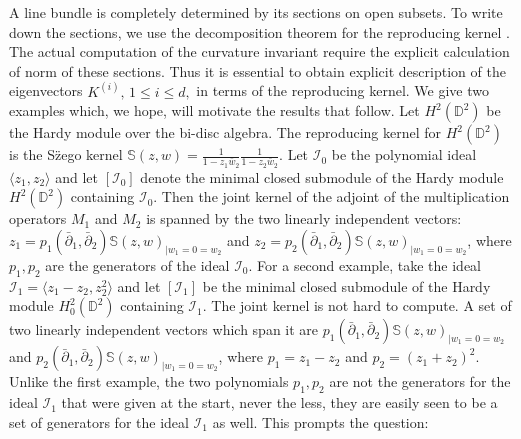 \documentclass[11pt]{amsart}
\theoremstyle{definition}
\numberwithin{equation}{section}
\begin{document}
A line bundle is completely determined by its sections on open subsets. To write down the sections, we use the decomposition theorem for the reproducing kernel \cite[Theorem 1.5]{bmp}. The actual computation of the curvature invariant require the explicit calculation of norm of these sections.  Thus it is essential to obtain explicit description of the eigenvectors  $K^{(i)},\,1\leq i\leq d,$ in terms of the reproducing kernel. We give two examples which, we hope, will motivate the results that follow.
Let $H^2(\mathbb D^2)$ be the Hardy module over the bi-disc algebra.
The reproducing kernel for $H^2(\mathbb D^2)$ is the S\"{z}ego kernel $\mathbb S(z,w) = \frac{1}{1-z_1\bar{w}_2}\frac{1}{1-z_2\bar{w}_2}$.
Let $\mathcal I_{0}$ be the polynomial ideal
$\langle z_1, z_2\rangle$ and let $[\mathcal I_{0}]$ denote the minimal closed
submodule of the Hardy module $H^2(\mathbb D^2)$ containing $\mathcal I_{0}$.
Then the joint kernel of
the adjoint of the multiplication operators $M_1$ and $M_2$ is spanned by the two linearly independent vectors: $z_1=p_1(\bar{\partial}_1,\bar{\partial}_2)  \mathbb S(z,w)_{|w_1=0=w_2}$ and  $z_2=p_2(\bar{\partial}_1,\bar{\partial}_2 ) \mathbb S(z,w)_{|w_1=0=w_2}$, where $p_1,p_2$ are the generators of the ideal $\mathcal I_{0}$. For a second example, take the ideal $\mathcal I_{1}=\langle z_1-z_2, z_2^2\rangle$ and let  $[\mathcal I_{1}]$ be the minimal closed
submodule of the Hardy module $H^2_0(\mathbb D^2)$ containing $\mathcal I_{1}$.  The joint kernel is not hard to compute. A set of two linearly independent vectors which span it are
$p_1(\bar{\partial}_1,\bar{\partial}_2)  \mathbb S(z,w)_{|w_1=0=w_2}$ and $p_2(\bar{\partial}_1,\bar{\partial}_2 )  \mathbb S(z,w)_{|w_1=0=w_2}$, where $p_1 = z_1 - z_2$ and $p_2 = (z_1 + z_2)^2$.
Unlike the first example, the two polynomials $p_1, p_2$ are not the generators for the ideal $\mathcal I_1$ that were given at the start, never the less, they are easily seen to be a set of generators for the ideal $\mathcal I_{1}$ as well.  This prompts the question:
\end{document}
